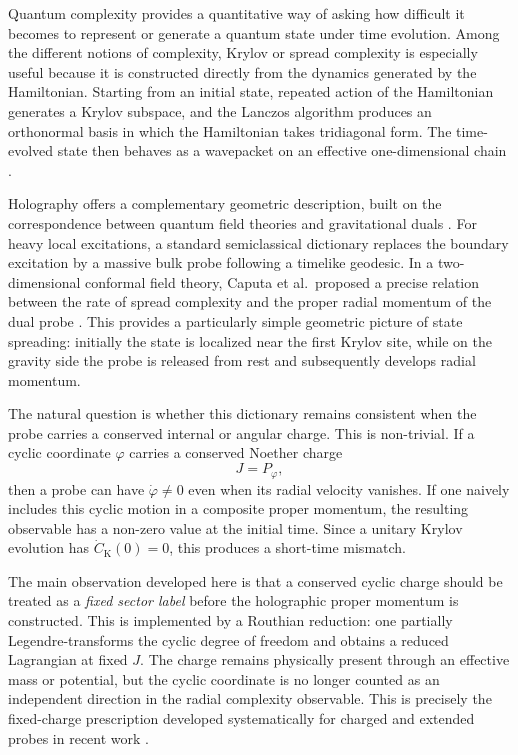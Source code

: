 \documentclass[11pt,a4paper]{article}
\theoremstyle{plain}
\theoremstyle{definition}
\theoremstyle{remark}
\begin{document}
Quantum complexity provides a quantitative way of asking how difficult it becomes to represent or generate a quantum state under time evolution. Among the different notions of complexity, Krylov or spread complexity is especially useful because it is constructed directly from the dynamics generated by the Hamiltonian. Starting from an initial state, repeated action of the Hamiltonian generates a Krylov subspace, and the Lanczos algorithm produces an orthonormal basis in which the Hamiltonian takes tridiagonal form. The time-evolved state then behaves as a wavepacket on an effective one-dimensional chain \cite{Parker:2018yvk,Balasubramanian:2022tpr}.

Holography offers a complementary geometric description, built on the correspondence between quantum field theories and gravitational duals \cite{Maldacena:1997re,Gubser:1998bc,Witten:1998qj}. For heavy local excitations, a standard semiclassical dictionary replaces the boundary excitation by a massive bulk probe following a timelike geodesic. In a two-dimensional conformal field theory, Caputa et al.\ proposed a precise relation between the rate of spread complexity and the proper radial momentum of the dual probe \cite{Caputa:2024odg}. This provides a particularly simple geometric picture of state spreading: initially the state is localized near the first Krylov site, while on the gravity side the probe is released from rest and subsequently develops radial momentum.

The natural question is whether this dictionary remains consistent when the probe carries a conserved internal or angular charge. This is non-trivial. If a cyclic coordinate $\varphi$ carries a conserved Noether charge
\begin{equation*}
J=P_\varphi,
\end{equation*}
then a probe can have $\dot\varphi\neq0$ even when its radial velocity vanishes. If one naively includes this cyclic motion in a composite proper momentum, the resulting observable has a non-zero value at the initial time. Since a unitary Krylov evolution has $\dot C_{\mathrm K}(0)=0$, this produces a short-time mismatch.

The main observation developed here is that a conserved cyclic charge should be treated as a \emph{fixed sector label} before the holographic proper momentum is constructed. This is implemented by a Routhian reduction: one partially Legendre-transforms the cyclic degree of freedom and obtains a reduced Lagrangian at fixed $J$. The charge remains physically present through an effective mass or potential, but the cyclic coordinate is no longer counted as an independent direction in the radial complexity observable. This is precisely the fixed-charge prescription developed systematically for charged and extended probes in recent work \cite{Chatzis:2026ekd}.
\end{document}
